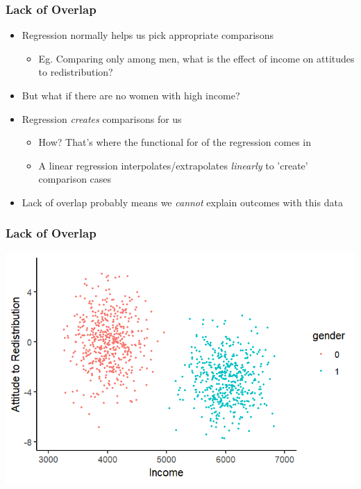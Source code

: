 \documentclass[xcolor=x11names,compress]{beamer}\usepackage[]{graphicx}\usepackage[]{color}
\makeatletter
\def\maxwidth{ %
  \ifdim\Gin@nat@width>\linewidth
    \linewidth
  \else
    \Gin@nat@width
  \fi
}
\newenvironment{knitrout}{}{} %
\renewcommand{\(}{\begin{columns}}
\renewcommand{\)}{\end{columns}}
\newcommand{\<}[1]{\begin{column}{#1}}
\renewcommand{\>}{\end{column}}
\makeatother
\begin{document}
\begin{frame}
\frametitle{Lack of Overlap}
\begin{itemize}
\item Regression normally helps us pick appropriate comparisons
\begin{itemize}
\item Eg. Comparing only among men, what is the effect of income on attitudes to redistribution? 
\end{itemize}
\item But what if there are no women with high income?
\item Regression \textit{creates} comparisons for us
\begin{itemize}
\item How? That's where the functional for of the regression comes in
\item A linear regression interpolates/extrapolates \textit{linearly} to 'create' comparison cases
\end{itemize}
\item Lack of overlap probably means we \textit{cannot} explain outcomes with this data
\end{itemize}
\end{frame}

\begin{frame}
\frametitle{Lack of Overlap}
\begin{knitrout}
\color{fgcolor}
\includegraphics[width=\maxwidth]{figure/overlap1-1} 

\end{knitrout}
\end{frame}
\end{document}
